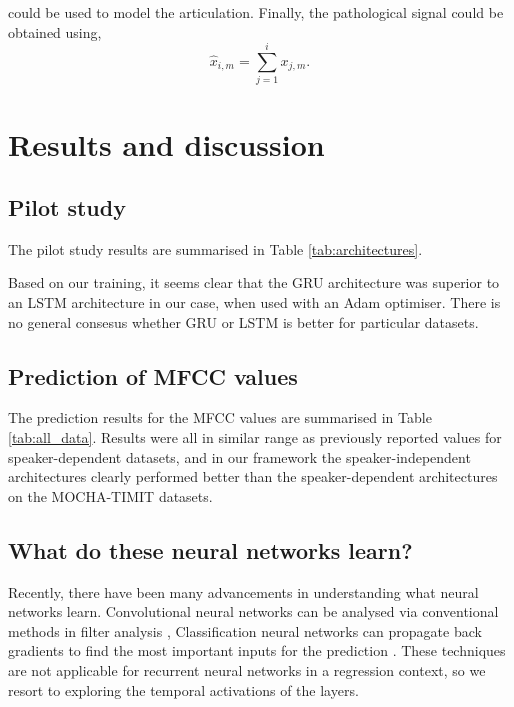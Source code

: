 \documentclass[a4paper]{article}
\begin{document}
\noindent could be used to model the articulation. Finally, the pathological signal could be obtained using,
\begin{equation*}
  \hat{x}_{i,m} = \sum_{j=1}^{i} x_{j,m}.
  \end{equation*}

\section{Results and discussion}

\subsection{Pilot study}

The pilot study results are summarised in Table \ref{tab:architectures}.

Based on our training, it seems clear that the GRU architecture was superior to an LSTM
architecture in our case, when used with an Adam optimiser.
There is no general consesus whether GRU or LSTM is better for particular
datasets. \cite{Jozefowicz2015}

\subsection{Prediction of MFCC values}

The prediction results for the MFCC values are summarised in Table
\ref{tab:all_data}. Results were all in similar range as previously
reported values for speaker-dependent datasets, and in our framework
the speaker-independent architectures clearly performed better than the
speaker-dependent architectures on the MOCHA-TIMIT datasets.

\subsection{What do these neural networks learn?} \label{section:visualisation}

Recently, there have been many advancements in understanding what neural networks learn.
Convolutional neural networks can be analysed via conventional methods in filter analysis \cite{Palaz2015},
Classification neural networks can propagate back gradients to find the most important inputs for
the prediction \cite{Selvaraju2017}. These techniques are not applicable for recurrent neural networks in a regression
context, so we resort to exploring the temporal activations of the layers.
\end{document}
